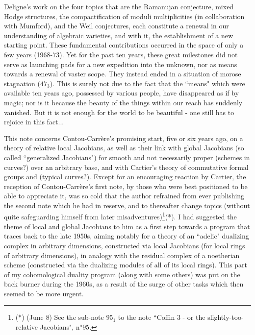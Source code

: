 Deligne's work on the four topics that are the Ramanujan conjecture, mixed Hodge structures, the compactification of moduli multiplicities (in collaboration with Mumford), and the Weil conjectures, each constitute a renewal in our understanding of algebraic varieties, and with it, the establishment of a new starting point. These fundamental contributions occurred in the space of only a few years (1968-73). Yet for the past ten years, these great milestones did not serve as launching pads for a new expedition into the unknown, nor as means towards a renewal of vaster scope. They instead ended in a situation of morose stagnation ($47_3$). This is surely not due to the fact that the ``means" which were available ten years ago, possessed by various people, have disappeared as if by magic; nor is it because the beauty of the things within our reach has suddenly vanished. But it is not enough for the world to be beautiful - one still has to rejoice in this fact... 

\label{note:47.1} This note concerns Contou-Carr\`ere's promising start, five or six years ago, on a theory of relative local Jacobians, as well as their link with global Jacobians (so called ``generalized Jacobians") for smooth and not necessarily proper (schemes in curves?) over an arbitrary base, and with Cartier's theory of commutative formal groups and (typical curves?).
Except for an encouraging reaction by Cartier, the reception of Contou-Carr\`ere's first note, by those who were best positioned to be able to appreciate it, was so cold that the author refrained from ever publishing the second note which he had in reserve, and to thereafter change topics (without quite safeguarding himself from later misadventures)\footnote{(*) (June 8) See the sub-note $95_1$ to the note ``Coffin 3 - or the slightly-too-relative Jacobians", n$^o 95$.}(*).
I had suggested the theme of local and global Jacobians to him as a first step towards a program that traces back to the late 1950s, aiming notably for a theory of an ``adelic" dualizing complex in arbitrary dimensions, constructed via local Jacobians (for local rings of arbitrary dimensions), in analogy with the residual complex of a noetherian scheme (constructed via the dualizing modules of all of its local rings). This part of my cohomological duality program (along with some others) was put on the back burner during the 1960s, as a result of the surge of other tasks which then seemed to be more urgent.

